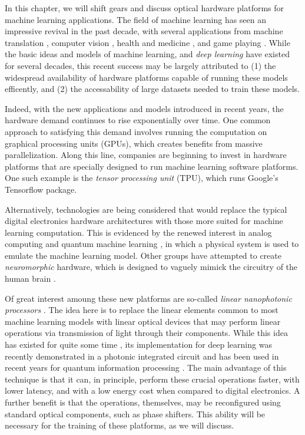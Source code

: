 
In this chapter, we will shift gears and discuss optical hardware platforms for machine learning applications.
The field of machine learning has seen an impressive revival in the past decade, with several applications from machine translation \cite{brown1993mathematics}, computer vision \cite{faugeras1993three}, health and medicine \cite{esteva2017dermatologist}, and game playing \cite{silver2017mastering}.
While the basic ideas and models of machine learning, and \textit{deep learning} \cite{goodfellow2016deep,lecun2015deep} have existed for several decades, this recent success may be largely attributed to (1) the widespread availability of hardware platforms capable of running these models efficently, and (2) the accessability of large datasets needed to train these models.

Indeed, with the new applications and models introduced in recent years, the hardware demand continues to rise exponentially over time.
One common approach to satisfying this demand involves running the computation on graphical processing units (GPUs), which creates benefits from massive parallelization.
Along this line, companies are beginning to invest in hardware platforms that are specially designed to run machine learning software platforms.
One such example is the \textit{tensor processing unit} (TPU), which runs Google's Tensorflow package.

Alternatively, technologies are being considered that would replace the typical digital electronics hardware architectures with those more suited for machine learning computation.
This is evidenced by the renewed interest in analog computing and quantum machine learning  \cite{biamonte_quantum_2017}, in which a physical system is used to emulate the machine learning model.
Other groups have attempted to create \textit{neuromorphic} hardware, which is designed to vaguely mimick the circuitry of the human brain \cite{tait_neuromorphic_2017}.

Of great interest amoung these new platforms are so-called \textit{linear nanophotonic processors} \cite{harris2018linear}.
The idea here is to replace the linear elements common to most machine learning models with linear optical devices that may perform linear operations via transmission of light through their components.
While this idea has existed for quite some time \cite{miller_sorting_2015,Miller2015,Miller2013a,Miller2015,Miller2013a}, its implementation for deep learning was recently demonstrated in a photonic integrated circuit \cite{shen2017deep} and has been used in recent years for quantum information processing \cite{obrien_photonic_2009}.
The main advantage of this technique is that it can, in principle, perform these crucial operations faster, with lower latency, and with a low energy cost when compared to digital electronics.
A further benefit is that the operations, themselves, may be reconfigured using standard optical components, such as phase shifters.
This ability will be necessary for the training of these platforms, as we will discuss.

